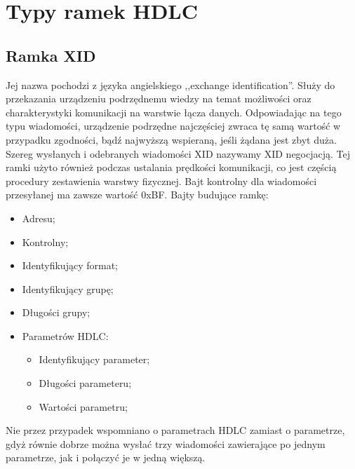 \section{Typy ramek HDLC}
	\subsection{Ramka XID}
	Jej nazwa pochodzi z języka angielskiego ,,exchange identification''. 
	Służy do przekazania urządzeniu podrzędnemu wiedzy na temat możliwości oraz charakterystyki komunikacji na warstwie łącza danych.
	\cite{WIKI_ENG_HDLC}
	Odpowiadając na tego typu wiadomości, urządzenie podrzędne najczęściej zwraca tę samą wartość w przypadku zgodności, 
	bądź najwyższą wspieraną, jeśli żądana jest zbyt duża. Szereg wysłanych i odebranych wiadomości XID nazywamy XID negocjacją.
	Tej ramki użyto również podczas ustalania prędkości komunikacji, co jest częścią procedury zestawienia warstwy fizycznej.
	Bajt kontrolny dla wiadomości przesyłanej ma zawsze wartość 0xBF. \newline
	Bajty budujące ramkę:
	\begin{itemize}
		\item Adresu;
		\item Kontrolny;
		\item Identyfikujący format;
		\item Identyfikujący grupę;
		\item Długości grupy;
		\item Parametrów HDLC:
		\begin{itemize}
			\item Identyfikujący parameter;
			\item Długości parameteru;
			\item Wartości parametru;
		\end{itemize}
	\end{itemize} 
	Nie przez przypadek wspomniano o parametrach HDLC zamiast o parametrze, gdyż równie dobrze można wysłać
    trzy wiadomości zawierające po jednym parametrze, jak i połączyć je w jedną większą.
	